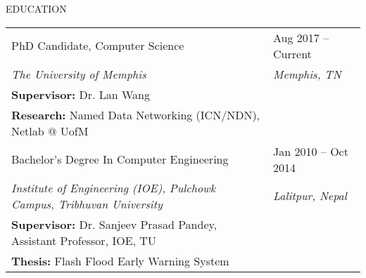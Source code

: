 \documentclass{resume} %
\newcommand\tab[1][1cm]{\hspace*{#1}}
\begin{document}
\vspace{-1.4cm}
\begin{rSection}{EDUCATION}
\vspace{-0.2cm}
    \noindent
        \begin{tabular}{ p{13cm} p{3.7cm} }
        PhD Candidate, Computer Science & \hfill Aug 2017 -- Current\\
        \textit{The University of Memphis}&  \textit{\hfill Memphis, TN} \\
        
        \tab \textbf{Supervisor:} Dr. Lan Wang \\
        \tab \textbf{Research:} Named Data Networking (ICN/NDN), Netlab @ UofM \vspace{-0.1cm}\\

        Bachelor’s Degree In Computer Engineering & \hfill Jan 2010 -- Oct 2014 \\
        \textit{Institute of Engineering (IOE), Pulchowk Campus, Tribhuvan University }&  \textit{\hfill Lalitpur, Nepal} \\
        \tab \textbf{Supervisor:} Dr. Sanjeev Prasad Pandey, Assistant Professor, IOE, TU \\
        \tab \textbf{Thesis:} Flash Flood Early Warning System \\
        
        
        \end{tabular}
\end{rSection}
\end{document}
